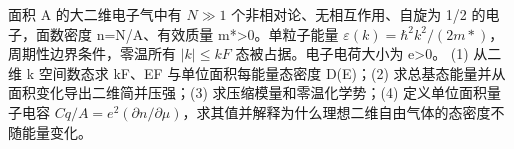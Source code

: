 面积 A 的大二维电子气中有 \(N\gg 1\) 个非相对论、无相互作用、自旋为 1/2 的电子，面数密度 n=N/A、有效质量 m*>0。单粒子能量 \(\varepsilon (k)=\hbar ^{2}k^{2}/(2m*)\)，周期性边界条件，零温所有 \(|k|\le kF\) 态被占据。电子电荷大小为 e>0。
(1) 从二维 k 空间数态求 kF、EF 与单位面积每能量态密度 D(E)；(2) 求总基态能量并从面积变化导出二维简并压强；(3) 求压缩模量和零温化学势；(4) 定义单位面积量子电容 \(Cq/A=e^{2}(\partial n/\partial \mu )\)，求其值并解释为什么理想二维自由气体的态密度不随能量变化。
